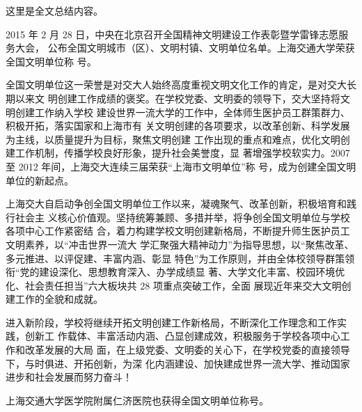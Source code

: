 
\begin{summary}
这里是全文总结内容。

2015 年 2 月 28 日，中央在北京召开全国精神文明建设工作表彰暨学雷锋志愿服务大会，
公布全国文明城市（区）、文明村镇、文明单位名单。上海交通大学荣获全国文明单位称
号。

全国文明单位这一荣誉是对交大人始终高度重视文明文化工作的肯定，是对交大长期以来文
明创建工作成绩的褒奖。在学校党委、文明委的领导下，交大坚持将文明创建工作纳入学校
建设世界一流大学的工作中，全体师生医护员工群策群力、积极开拓，落实国家和上海市有
关文明创建的各项要求，以改革创新、科学发展为主线，以质量提升为目标，聚焦文明创建
工作出现的重点和难点，优化文明创建工作机制，传播学校良好形象，提升社会美誉度，显
著增强学校软实力。2007 至 2012 年间，上海交大连续三届荣获“上海市文明单位”称
号，成为创建全国文明单位的新起点。

上海交大自启动争创全国文明单位工作以来，凝魂聚气、改革创新，积极培育和践行社会主
义核心价值观。坚持统筹兼顾、多措并举，将争创全国文明单位与学校各项中心工作紧密结
合，着力构建学校文明创建新格局，不断提升师生医护员工文明素养，以“冲击世界一流大
学汇聚强大精神动力”为指导思想，以“聚焦改革、多元推进、以评促建、丰富内涵、彰显
特色”为工作原则，并由全体校领导群策领衔“党的建设深化、思想教育深入、办学成绩显
著、大学文化丰富、校园环境优化、社会责任担当”六大板块共 28 项重点突破工作，全面
展现近年来交大文明创建工作的全貌和成就。

进入新阶段，学校将继续开拓文明创建工作新格局，不断深化工作理念和工作实践，创新工
作载体、丰富活动内涵、凸显创建成效，积极服务于学校各项中心工作和改革发展的大局
面，在上级党委、文明委的关心下，在学校党委的直接领导下，与时俱进、开拓创新，为深
化内涵建设、加快建成世界一流大学、推动国家进步和社会发展而努力奋斗！

上海交通大学医学院附属仁济医院也获得全国文明单位称号。
\end{summary}
